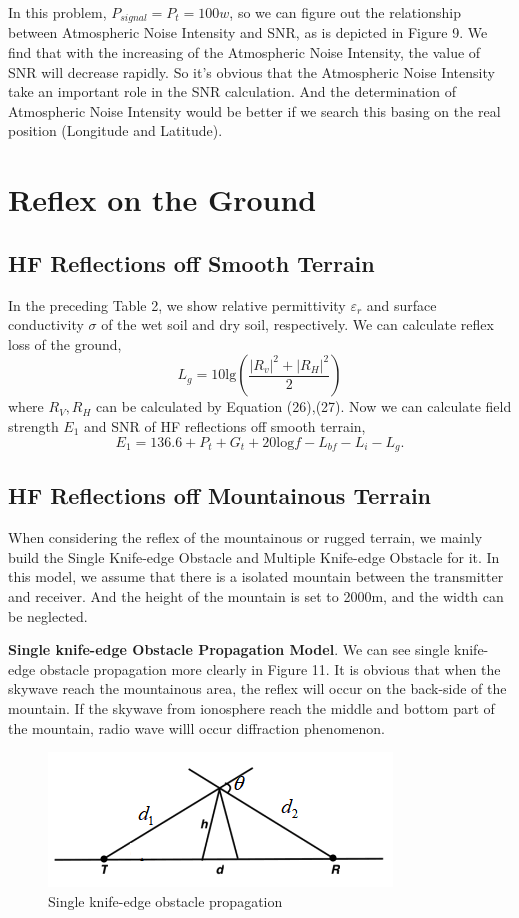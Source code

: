 \documentclass{mcmthesis}
\begin{document}
In this problem, $P_{signal}=P_t=100w$, so
   we can figure out the relationship between Atmospheric Noise Intensity and SNR, as is depicted in Figure 9. 
We find that with the increasing of the Atmospheric Noise Intensity, the value of SNR will decrease rapidly. So it's obvious that the Atmospheric Noise Intensity take an important role in the SNR calculation. And the determination of Atmospheric Noise Intensity would be better if we search this basing on the real position (Longitude and Latitude).
    
\section{Reflex on the Ground}
\subsection{HF Reflections off Smooth Terrain}
In the preceding Table 2, we show relative permittivity $\varepsilon_r$ and surface conductivity $\sigma$ of the wet soil and dry soil, respectively. We can calculate reflex loss of the ground,
\begin{equation}
L_g = 10\mathrm{lg}\left( 
\frac{|R_v|^2+|R_H|^2}{2}
 \right)
\end{equation}
where $R_V,R_H$ can be calculated by Equation (26),(27). Now we can calculate field strength $E_1$ and SNR of HF reflections off smooth terrain,
\begin{equation}
E_1 = 136.6+P_t+G_t+20\mathrm{log} f-L_{bf}-L_i-L_g. 
\end{equation}
\subsection{HF Reflections off Mountainous Terrain}
When considering the reflex of the mountainous or rugged terrain, we mainly build the Single Knife-edge Obstacle and Multiple Knife-edge Obstacle for it. In this model, we assume that there is a isolated mountain between the transmitter and receiver. And the height of the mountain is set to 2000m, and the width can be neglected. 

\textbf{Single knife-edge Obstacle Propagation Model}. We can see single knife-edge obstacle propagation more clearly in Figure 11.
  It is obvious that when the skywave reach the mountainous area, the reflex will occur on the back-side of the mountain.  If the skywave from ionosphere reach the middle and bottom part of the mountain, radio wave willl occur diffraction phenomenon. 
\begin{figure}[!htbp]
    \centering
    \includegraphics[scale=0.55]{figure/popopo.png}
    \caption{Single knife-edge obstacle propagation}
    \label{fig:myphoto12}
    \end{figure}
    
\end{document}
